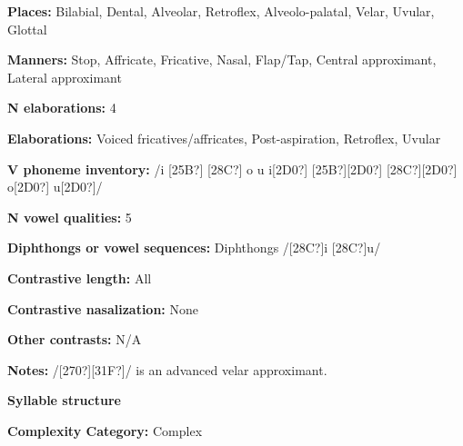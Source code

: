 \begin{styleBody}
\textbf{Places:} Bilabial, Dental, Alveolar, Retroflex, Alveolo-palatal, Velar, Uvular, Glottal
\end{styleBody}

\begin{styleBody}
\textbf{Manners:} Stop, Affricate, Fricative, Nasal, Flap/Tap, Central approximant, Lateral approximant
\end{styleBody}

\begin{styleBody}
\textbf{N elaborations:} 4
\end{styleBody}

\begin{styleBody}
\textbf{Elaborations:} Voiced fricatives/affricates, Post-aspiration, Retroflex, Uvular
\end{styleBody}

\begin{styleBody}
\textbf{V phoneme inventory:} /i [25B?] [28C?] o u i[2D0?] [25B?][2D0?] [28C?][2D0?] o[2D0?] u[2D0?]/
\end{styleBody}

\begin{styleBody}
\textbf{N vowel qualities:} 5
\end{styleBody}

\begin{styleBody}
\textbf{Diphthongs or vowel sequences:} Diphthongs /[28C?]i [28C?]u/
\end{styleBody}

\begin{styleBody}
\textbf{Contrastive length:} All
\end{styleBody}

\begin{styleBody}
\textbf{Contrastive nasalization:} None
\end{styleBody}

\begin{styleBody}
\textbf{Other contrasts:} N/A
\end{styleBody}

\begin{styleBody}
\textbf{Notes:} /[270?][31F?]/ is an advanced velar approximant.
\end{styleBody}

\begin{styleBody}
\textbf{Syllable structure}
\end{styleBody}

\begin{styleBody}
\textbf{Complexity Category:} Complex
\end{styleBody}

